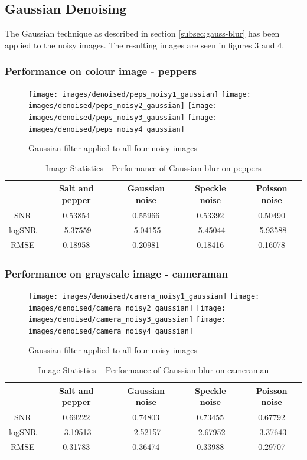 \documentclass{article}
\begin{document}
\subsection{Gaussian Denoising}
\label{subsec:gauss-denoise}
The Gaussian technique as described in section \ref{subsec:gauss-blur} has been applied
to the noisy images. The resulting images are seen in figures 3 and 4.
\subsubsection{Performance on colour image - peppers}
\begin{figure}[H]
  \centering
  \texttt{[image: images/denoised/peps\_noisy1\_gaussian]}
  \texttt{[image: images/denoised/peps\_noisy2\_gaussian]}
  \texttt{[image: images/denoised/peps\_noisy3\_gaussian]}
  \texttt{[image: images/denoised/peps\_noisy4\_gaussian]}
  \caption{Gaussian filter applied to all four noisy images }
\end{figure}
\begin{table}[H]
  \centering
  \begin{tabular}{c|c|c|c|c}
    & Salt and pepper & Gaussian noise & Speckle noise & Poisson noise \\
    \hline
    SNR    & 0.53854  & 0.55966  & 0.53392  & 0.50490  \\
    logSNR & -5.37559 & -5.04155 & -5.45044 & -5.93588 \\
    RMSE   & 0.18958  & 0.20981  & 0.18416  & 0.16078  \\
  \end{tabular}
\caption{Image Statistics - Performance of Gaussian blur on peppers}
\end{table}
%
\subsubsection{Performance on grayscale image - cameraman}
\begin{figure}[H]
  \centering
  \texttt{[image: images/denoised/camera\_noisy1\_gaussian]}
  \texttt{[image: images/denoised/camera\_noisy2\_gaussian]}
  \texttt{[image: images/denoised/camera\_noisy3\_gaussian]}
  \texttt{[image: images/denoised/camera\_noisy4\_gaussian]}
  \caption{Gaussian filter applied to all four noisy images }
\end{figure}
%
\begin{table}[H]
  \centering
  \begin{tabular}{c|c|c|c|c}
    & Salt and pepper & Gaussian noise & Speckle noise & Poisson noise \\
    \hline
    SNR    & 0.69222  & 0.74803  & 0.73455  & 0.67792  \\
    logSNR & -3.19513 & -2.52157 & -2.67952 & -3.37643 \\
    RMSE   & 0.31783  & 0.36474  & 0.33988  & 0.29707  \\
  \end{tabular}
  \caption{Image Statistics -- Performance of Gaussian blur on cameraman}
\end{table}
%
\end{document}
